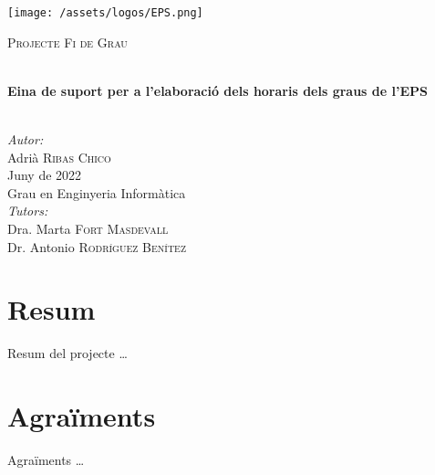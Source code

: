 \documentclass[a4paper,12pt]{ThesisStyle}
\begin{document}
\newpage

\begin{titlepage}

  \texttt{[image: /assets/logos/EPS.png]} \\[1cm]
  \begin{center}
    \textsc{\Large Projecte Fi de Grau} \\[1cm]

    \begin{spacing}{2}
      \HRule \\
      \textbf{\Huge Eina de suport per a l’elaboració dels horaris dels graus de l’EPS} \\
      \HRule \\[0.5cm]
    \end{spacing}

    {
    \large
    \emph{Autor:} \\
    Adrià \textsc{Ribas Chico} \\[1cm]
    Juny de 2022 \\[1cm]
    Grau en Enginyeria Informàtica \\[1cm]
    \emph{Tutors:} \\
    Dra. Marta \textsc{Fort Masdevall} \\
    Dr. Antonio \textsc{Rodríguez Benítez} \\
    }

  \end{center}
\end{titlepage}

\titlepage

\dominitoc


\chapter*{Resum}
\label{cap:resum}

Resum del projecte \ldots

\chapter*{Agraïments}
\label{cap:agraiments}

Agraïments \ldots


\tableofcontents


\end{document}
